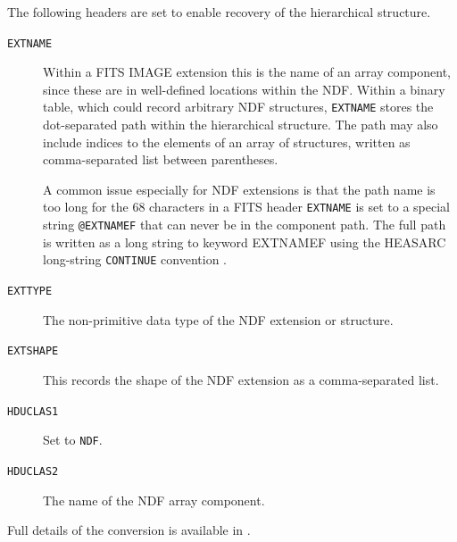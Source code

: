 \documentclass[final,authoryear,5p,times,twocolumn]{elsarticle}
\begin{document}
The following headers are set to enable recovery of the hierarchical
structure.

\begin{description}

\item [\texttt{EXTNAME}]
Within a FITS IMAGE extension this is the name of an array component, since
these are in well-defined locations within the NDF. Within a binary
table, which could record arbitrary NDF structures, \texttt{EXTNAME} stores the
dot-separated path within the hierarchical structure.
The path may also include indices to the elements of an array of
structures, written as comma-separated list between parentheses.

A common issue especially for NDF extensions is that the path name is
too long for the 68 characters in a FITS header \texttt{EXTNAME} is set to a
special string \texttt{@EXTNAMEF} that can never be in the component
path.  The full path is written as a long string to keyword EXTNAMEF
using the HEASARC long-string \texttt{CONTINUE}
convention \citep{2007Continue}.

\item [\texttt{EXTTYPE}]
The non-primitive data type of the NDF extension or structure.

\item [\texttt{EXTSHAPE}]
This records the shape of the NDF extension as a comma-separated list.

\item [\texttt{HDUCLAS1}]
Set to \texttt{NDF}.

\item [\texttt{HDUCLAS2}]
The name of the NDF array component.

\end{description}

Full details of the conversion is available in \citet{SUN55}.
\end{document}
